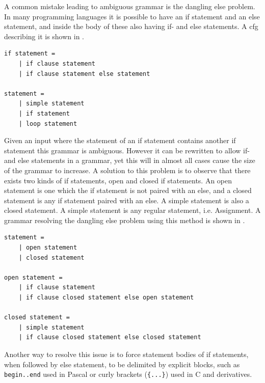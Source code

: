 A common mistake leading to ambiguous grammar is the dangling else problem. \citep{danglingelse}
In many programming languages it is possible to have an if statement and an else statement, and inside the body of these also having if- and else statements. 
A \acrshort{cfg} describing it is shown in .

\begin{lstlisting}[caption={An example of a \acrshort{cfg} describing an if statement. \citep{danglingelse}},frame=tlrb,label={lst:danglingelseex1},numbers=none]
if statement =
    | if clause statement
    | if clause statement else statement

statement =
    | simple statement
    | if statement
    | loop statement
\end{lstlisting}

Given an input where the statement of an if statement contains another if statement this grammar is ambiguous.  
However it can be rewritten to allow if- and else statements in a grammar, yet this will in almost all cases cause the size of the grammar to increase. 
A solution to this problem is to observe that there exists two kinds of if statements, open and closed if statements.
An open statement is one which the if statement is not paired with an else, and a closed statement is any if statement paired with an else.
A simple statement is also a closed statement.
A simple statement is any regular statement, i.e. Assignment.
A grammar resolving the dangling else problem using this method is shown in .

\begin{lstlisting}[caption={An example of a \acrshort{cfg} describing an if statement, that is not ambiguous. \citep{danglingelse}},frame=tlrb,label={lst:danglingelseex2},numbers=none]
statement =
    | open statement
    | closed statement

open statement =
    | if clause statement
    | if clause closed statement else open statement

closed statement =
    | simple statement
    | if clause closed statement else closed statement
\end{lstlisting}

Another way to resolve this issue is to force statement bodies of if statements, when followed by else statement, to be delimited by explicit blocks, such as \texttt{begin..end} used in Pascal or curly brackets (\texttt{\{...\}}) used in C and derivatives. 

